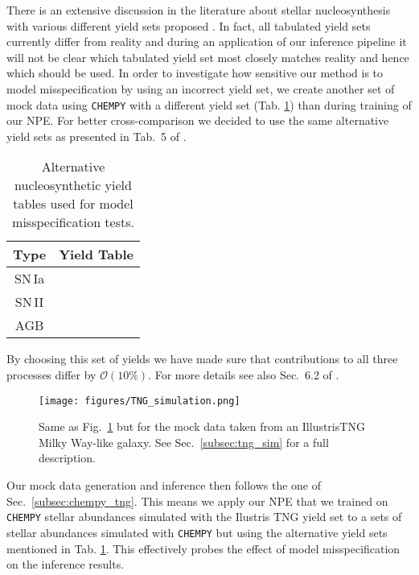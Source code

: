 \documentclass{aa}
\begin{document}
There is an extensive discussion in the literature about stellar nucleosynthesis with various different yield sets proposed \citep[see e.g. the discussion in][]{Rybizki_2017}. In fact, all tabulated yield sets currently differ from reality and during an application of our inference pipeline it will not be clear which tabulated yield set most closely matches reality and hence which should be used.
In order to investigate how sensitive our method is to model misspecification by using an incorrect yield set, we create another set of mock data using \texttt{CHEMPY} with a different yield set (Tab. \ref{tab:chempy_ALT_yields}) than during training of our NPE. For better cross-comparison we decided to use the same alternative yield sets as presented in Tab.~5 of \citep{Philcox_2019}. 

\begin{table}[]
\caption{Alternative nucleosynthetic yield tables used for model misspecification tests.}
     \centering
     \begin{tabular}{c|c}
       Type & Yield Table \\
        \hline
         SN\,Ia & \citet{2003NuPhA.718..139T} \\
         SN\,II & \citet{Nomoto2013} \\
         AGB & \citet{2016ApJ...825...26K}
     \end{tabular}
\label{tab:chempy_ALT_yields}
\end{table}

By choosing this set of yields we have made sure that contributions to all three processes differ by $\mathcal{O}(10\%)$. For more details see also Sec.~6.2 of \citet{Philcox_2019}.

\begin{figure}
    \centering
    \texttt{[image: figures/TNG\_simulation.png]}
    \vspace{-.25cm}
    \caption{Same as Fig.~\ref{fig:CHEMPY_TNG_sim_sbi} but for the mock data taken from an IllustrisTNG Milky Way-like galaxy. See Sec.~\ref{subsec:tng_sim} for a full description.}
    \label{fig:CHEMPY_TNG_sim_sbi} 
\end{figure}

Our mock data generation and inference then follows the one of Sec.~\ref{subsec:chempy_tng}. This means we apply our NPE that we trained on \texttt{CHEMPY} stellar abundances simulated with the Ilustris TNG yield set to a sets of stellar abundances simulated with \texttt{CHEMPY} but using the alternative yield sets mentioned in Tab. \ref{tab:chempy_ALT_yields}. This effectively probes the effect of model misspecification on the inference results.
\end{document}
